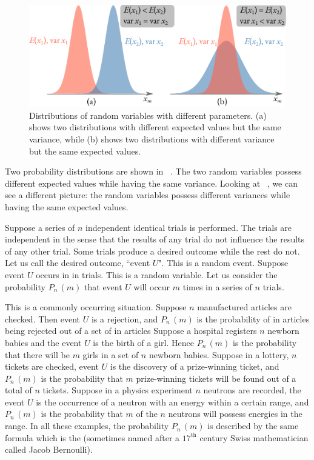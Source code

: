 \begin{figure}[!h]
 \centering
 \includegraphics[width=\tfwidth]{figures/exp-val-variation.pdf}
\caption{Distributions of random variables with different
  parameters. (a) shows two distributions with different expected
  values but the same variance, while (b) shows two distributions with
  different variance but the same expected values.\label{exp-val-variation}}
 \end{figure}

Two probability distributions are shown in ~. The two random variables possess different expected values while having the same
variance. Looking at ~, we can see a different
picture: the random variables possess different variances while having
the same expected values.


  Suppose a series of $n$
independent identical trials is performed. The trials are independent
in the sense that the results of any trial do not influence the
results of any other trial. Some trials produce a desired outcome
while the rest do not. Let us call the desired outcome, ``event
$U$". This is a random event. Suppose event $U$ occurs in in trials. This
is a random variable. Let us consider the probability $P_{n}\,(m)$ that event
$U$ will occur $m$ times in a series of $n$ trials.


This is a commonly occurring situation. Suppose $n$ manufactured
articles are checked. Then event $U$ is a rejection, and $P_{n}\,(m)$ is
the probability of in articles being rejected out of a set of in
articles Suppose a hospital registers $n$ newborn babies and the event
$U$ is the birth of a girl. Hence $P_{n}\,(m)$ is the probability that
there will be $m$ girls in a set of $n$ newborn babies. Suppose in a
lottery, $n$ tickets are checked, event $U$ is the discovery of a
prize-winning ticket, and $P_{n}\,(m)$ is the probability that $m$
prize-winning tickets will be found out of a total of $n$
tickets. Suppose in a physics experiment $n$ neutrons are recorded,
the event $U$ is the occurrence of a neutron with an energy within a
certain range, and $P_{n}\,(m)$ is the probability that $m$ of the $n$
neutrons will possess energies in the range. In all these examples,
the probability  $P_{n}\,(m)$ is described by the same formula which is the
 (sometimes named after a $17^{\text{th}}$ century Swiss mathematician called Jacob Bernoulli).

